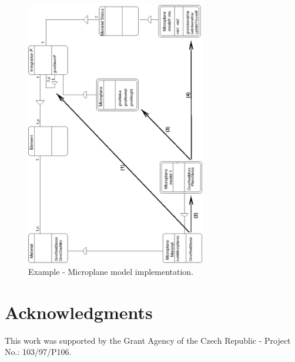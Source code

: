 \documentclass[a4paper]{article}
\begin{document}
\begin{figure}[tb]
\else
\centerline{\includegraphics[width=0.7\textwidth]{microp.eps}}
\fi
\caption{Example - Microplane model implementation.}
\label{microplaneFig}
\end{figure}



\clearpage



\section*{Acknowledgments}
This work was supported by the Grant Agency of the Czech Republic -
Project No.: 103/97/P106.
\end{document}
